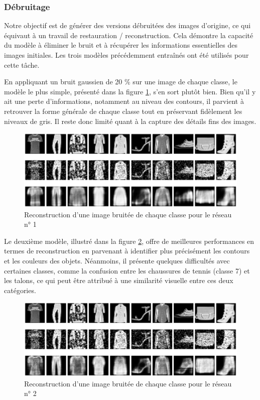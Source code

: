 \documentclass{article}
\begin{document}
\subsubsection{Débruitage}

Notre objectif est de générer des versions débruitées des images d'origine, ce qui équivaut à un travail de restauration / reconstruction. Cela démontre la capacité du modèle à éliminer le bruit et à récupérer les informations essentielles des images initiales. Les trois modèles précédemment entraînés ont été utilisés pour cette tâche.

En appliquant un bruit gaussien de 20 \% sur une image de chaque classe, le modèle le plus simple, présenté dans la figure \ref{fig:reconstruct_noisy_all_small}, s'en sort plutôt bien. Bien qu'il y ait une perte d'informations, notamment au niveau des contours, il parvient à retrouver la forme générale de chaque classe tout en préservant fidèlement les niveaux de gris. Il reste donc limité quant à la capture des détails fins des images.

\begin{figure}[htbp]
    \centering
    \includegraphics*[width=\textwidth]{reconstruct_noisy_all_simple.pdf}
    \caption{Reconstruction d'une image bruitée de chaque classe pour le réseau n° 1}
    \label{fig:reconstruct_noisy_all_small}
\end{figure}

Le deuxième modèle, illustré dans la figure \ref{fig:reconstruct_noisy_all_medium}, offre de meilleures performances en termes de reconstruction en parvenant à identifier plus précisément les contours et les couleurs des objets. Néanmoins, il présente quelques difficultés avec certaines classes, comme la confusion entre les chaussures de tennis (classe 7) et les talons, ce qui peut être attribué à une similarité visuelle entre ces deux catégories.

\begin{figure}[htbp]
    \centering
    \includegraphics*[width=\textwidth]{reconstruct_noisy_all_medium.pdf}
    \caption{Reconstruction d'une image bruitée de chaque classe pour le réseau n° 2}
    \label{fig:reconstruct_noisy_all_medium}
\end{figure}
\end{document}
